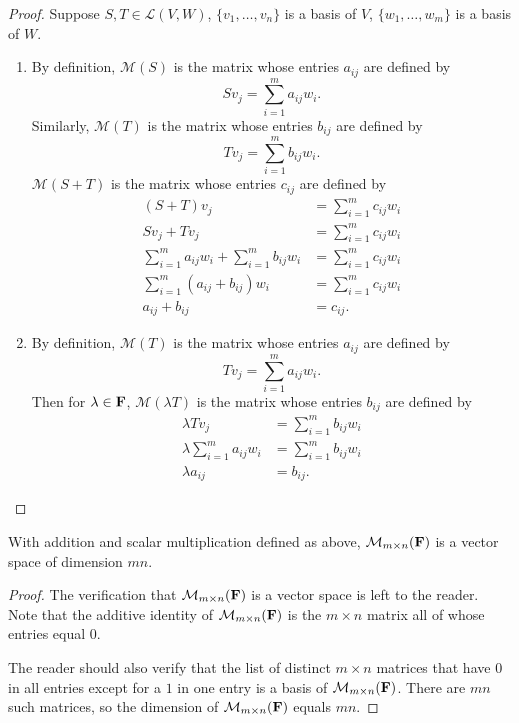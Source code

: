 \begin{proof}
Suppose $S,T\in\mathcal{L}(V,W)$, $\{v_1,\dots,v_n\}$ is a basis of $V$, $\{w_1,\dots,w_m\}$ is a basis of $W$.
\begin{enumerate}[label=(\roman*)]
\item By definition, $\mathcal{M}(S)$ is the matrix whose entries $a_{ij}$ are defined by
\[Sv_j=\sum_{i=1}^{m}a_{ij}w_i.\]
Similarly, $\mathcal{M}(T)$ is the matrix whose entries $b_{ij}$ are defined by
\[Tv_j=\sum_{i=1}^{m}b_{ij}w_i.\]
$\mathcal{M}(S+T)$ is the matrix whose entries $c_{ij}$ are defined by
\begin{align*}
(S+T)v_j&=\sum_{i=1}^{m}c_{ij}w_i\\
Sv_j+Tv_j&=\sum_{i=1}^{m}c_{ij}w_i\\
\sum_{i=1}^{m}a_{ij}w_i+\sum_{i=1}^{m}b_{ij}w_i&=\sum_{i=1}^{m}c_{ij}w_i\\
\sum_{i=1}^{m}(a_{ij}+b_{ij})w_i&=\sum_{i=1}^{m}c_{ij}w_i\\
a_{ij}+b_{ij}&=c_{ij}.
\end{align*}

\item By definition, $\mathcal{M}(T)$ is the matrix whose entries $a_{ij}$ are defined by
\[Tv_j=\sum_{i=1}^{m}a_{ij}w_i.\]
Then for $\lambda\in\mathbf F$, $\mathcal{M}(\lambda T)$ is the matrix whose entries $b_{ij}$ are defined by
\begin{align*}
\lambda Tv_j&=\sum_{i=1}^{m}b_{ij}w_i\\
\lambda\sum_{i=1}^{m}a_{ij}w_i&=\sum_{i=1}^{m}b_{ij}w_i\\
\lambda a_{ij}&=b_{ij}.
\end{align*}
\end{enumerate}
\end{proof}

\begin{proposition}
With addition and scalar multiplication defined as above, $\mathcal{M}_{m\times n}(\mathbf F)$ is a vector space of dimension $mn$.
\end{proposition}

\begin{proof}
The verification that $\mathcal{M}_{m\times n}(\mathbf F)$ is a vector space is left to the reader. Note that the additive identity of $\mathcal{M}_{m\times n}(\mathbf F)$ is the $m\times n$ matrix all of whose entries equal $0$.

The reader should also verify that the list of distinct $m\times n$ matrices that have $0$ in all entries except for a $1$ in one entry is a basis of $\mathcal{M}_{m\times n}(\mathbf F)$. There are $mn$ such matrices, so the dimension of $\mathcal{M}_{m\times n}(\mathbf F)$ equals $mn$.
\end{proof}

